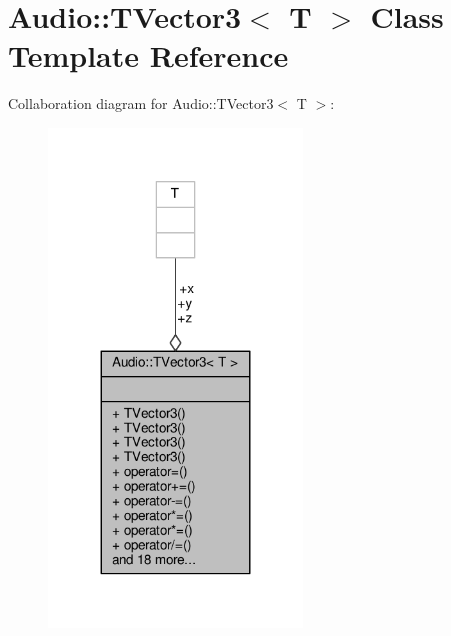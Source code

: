 \hypertarget{classAudio_1_1TVector3}{}\section{Audio\+:\+:T\+Vector3$<$ T $>$ Class Template Reference}
\label{classAudio_1_1TVector3}


Collaboration diagram for Audio\+:\+:T\+Vector3$<$ T $>$\+:
\nopagebreak
\begin{figure}[H]
\begin{center}
\leavevmode
\includegraphics[width=191pt]{d3/d8c/classAudio_1_1TVector3__coll__graph}
\end{center}
\end{figure}
